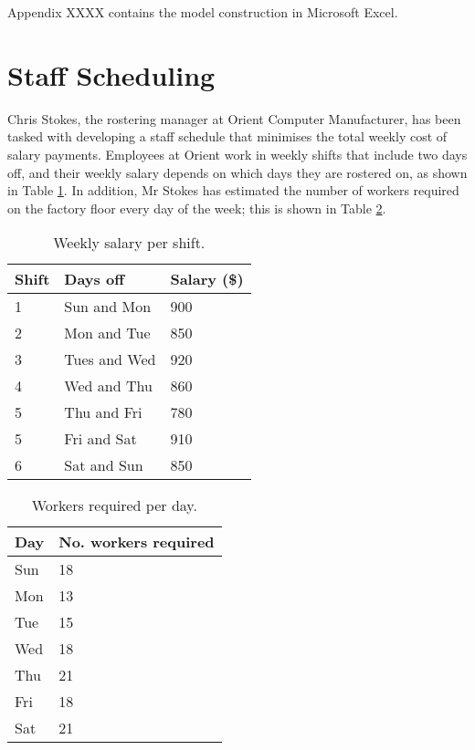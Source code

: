 \documentclass[11pt, a4paper]{article}
\begin{document}
    Appendix XXXX contains the model construction in Microsoft Excel.

    \newpage

    \section{Staff Scheduling}

    Chris Stokes, the rostering manager at Orient Computer Manufacturer, has been tasked with developing a staff schedule that minimises the total weekly cost of salary payments. Employees at Orient work in weekly shifts that include two days off, and their weekly salary depends on which days they are rostered on, as shown in Table \ref{shifts}. In addition, Mr Stokes has estimated the number of workers required on the factory floor every day of the week; this is shown in Table \ref{workers_needed}. 

    \begin{table}[!ht]
        \centering
        \caption{Weekly salary per shift.}
        \begin{tabular}{|l|l|l|}
            \hline
            Shift   & Days off      & Salary (\$)  \\ \hline
            1       & Sun and Mon   & 900          \\ \hline
            2       & Mon and Tue   & 850          \\ \hline
            3       & Tues and Wed  & 920          \\ \hline
            4       & Wed and Thu   & 860          \\ \hline
            5       & Thu and Fri   & 780          \\ \hline
            5       & Fri and Sat   & 910          \\ \hline
            6       & Sat and Sun   & 850          \\ \hline
        \end{tabular}
        \label{shifts}
    \end{table}

    \begin{table}[!ht]
        \centering
        \caption{Workers required per day.}
        \begin{tabular}{|l|l|}
            \hline
            Day     & No. workers required  \\ \hline
            Sun     & 18                    \\ \hline
            Mon     & 13                    \\ \hline
            Tue     & 15                    \\ \hline
            Wed     & 18                    \\ \hline
            Thu     & 21                    \\ \hline
            Fri     & 18                    \\ \hline
            Sat     & 21                    \\ \hline     
        \end{tabular}
        \label{workers_needed}
    \end{table}

    
\end{document}
